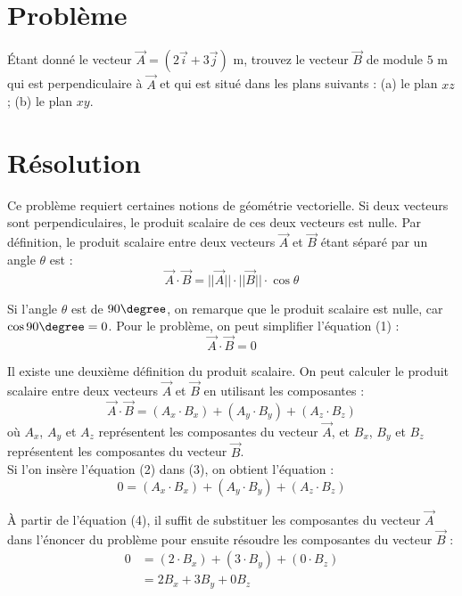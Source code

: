 \documentclass[11pt]{article}
\begin{document}
\section*{Problème}
Étant donné le vecteur $\vec{A}=(2\vec{i}+3\vec{j})\text{ m}$, trouvez le vecteur $\vec{B}$ de module $5\text{ m}$ qui est perpendiculaire à $\vec{A}$ et qui est situé dans les plans suivants : (a) le plan $xz$; (b) le plan $xy$. \cite{problem}

\section*{Résolution}
Ce problème requiert certaines notions de géométrie vectorielle. Si deux vecteurs sont perpendiculaires, le produit scalaire de ces deux vecteurs est nulle. Par définition, le produit scalaire entre deux vecteurs $\vec{A}$ et $\vec{B}$ étant séparé par un angle $\theta$ est :
\begin{equation}
\vec{A}\cdot\vec{B} = ||\vec{A}||\cdot||\vec{B}||\cdot\cos\theta
\end{equation}

Si l'angle $\theta$ est de $90\degree$, on remarque que le produit scalaire est nulle, car $\cos90\degree=0$. Pour le problème, on peut simplifier l'équation (1) :
\begin{equation}
\vec{A}\cdot\vec{B} = 0
\end{equation}

Il existe une deuxième définition du produit scalaire. On peut calculer le produit scalaire entre deux vecteurs $\vec{A}$ et $\vec{B}$ en utilisant les composantes :
\begin{equation}
\vec{A}\cdot\vec{B} = (A_x\cdot B_x)+(A_y\cdot B_y)+(A_z\cdot B_z)
\end{equation}
où $A_x$, $A_y$ et $A_z$ représentent les composantes du vecteur $\vec{A}$, et $B_x$, $B_y$ et $B_z$ représentent les composantes du vecteur $\vec{B}$.\\

Si l'on insère l'équation (2) dans (3), on obtient l'équation :
\begin{equation}
0 = (A_x\cdot B_x)+(A_y\cdot B_y)+(A_z\cdot B_z)
\end{equation}

À partir de l'équation (4), il suffit de substituer les composantes du vecteur $\vec{A}$ dans l'énoncer du problème pour ensuite résoudre les composantes du vecteur $\vec{B}$ :
\begin{equation}
\begin{split}
0 &= (2\cdot B_x)+(3\cdot B_y)+(0\cdot B_z)\\
  &= 2B_x+3B_y+0B_z
\end{split}
\end{equation}
\pagebreak
\end{document}
